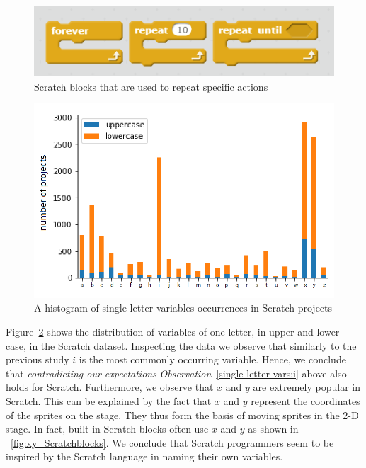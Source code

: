 \documentclass[conference]{IEEEtran}
\begin{document}
\begin{figure}[h]
	\begin{center}
		\includegraphics[scale=0.5]{fig/loops_in_Scratch}
		\caption{Scratch blocks that are used to repeat specific actions}
		\label{fig:loop_Scratchblocks}
	\end{center}
\end{figure} 

\begin{figure}[h]
	\begin{center}
		\includegraphics[width=\columnwidth]{fig/project/varname_singleletter-project}
		\caption{A histogram of single-letter variables occurrences in Scratch projects }
		\label{fig:one_letter_occurrence}
	\end{center}
\end{figure} 
Figure~\ref{fig:one_letter_occurrence} shows the distribution of variables of one letter, in upper and lower case, in the Scratch dataset. 
Inspecting the data we observe that similarly to the previous study $i$ is the most commonly occurring variable. 
Hence, we conclude that \emph{contradicting our expectations} \emph{Observation}~\ref{single-letter-vars:i} above also holds for Scratch.
Furthermore, we observe that $x$ and $y$ are extremely popular in Scratch. 
This can be explained by the fact that $x$ and $y$ represent the coordinates of the sprites on the stage. They thus form the basis of moving sprites in the 2-D stage. 
In fact, built-in Scratch blocks often use $x$ and $y$ as shown in \figurename{~\ref{fig:xy_Scratchblocks}}. 
We conclude that Scratch programmers seem to be inspired by the Scratch language in naming their own variables. 
\end{document}
